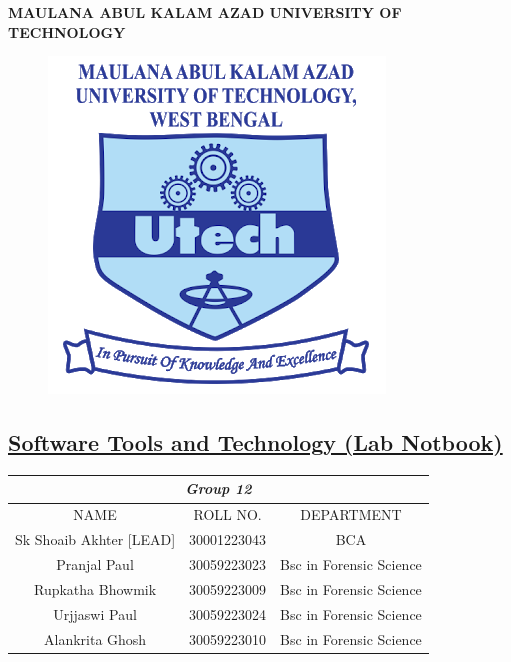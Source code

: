 \documentclass{article}
\begin{document}
\begin{center}
    \huge\textbf{MAULANA ABUL KALAM AZAD UNIVERSITY OF TECHNOLOGY}\\

\end{center}
\begin{figure}[h!]
    \centering
    \includegraphics[width=0.3\linewidth]{makaut.png}
\end{figure}
\date{\today} 
\begin{center}
    \section*{\textbf{\underline{Software Tools and Technology (Lab Notbook)}}}
    \vspace{0.4cm}
\end{center}
\begin{center}

\vspace{0.2 cm}
\renewcommand{\arraystretch}{2}
\hspace*{0.08in}
\begin{tabular}{ |c|c|c| }
\hline
\multicolumn{3}{|c|}{\Large \textbf{\textit{Group 12}}} \\
\hline
NAME & ROLL NO.& DEPARTMENT \\
\hline
Sk Shoaib Akhter [LEAD]& 30001223043& BCA \\
\hline
Pranjal Paul& 30059223023& Bsc in Forensic Science\\
\hline
Rupkatha Bhowmik& 30059223009& Bsc in Forensic Science\\
\hline
Urjjaswi Paul& 30059223024& Bsc in Forensic Science\\
\hline
Alankrita Ghosh& 30059223010& Bsc in Forensic Science\\
\hline
\end{tabular}

\end{center}
\end{document}
